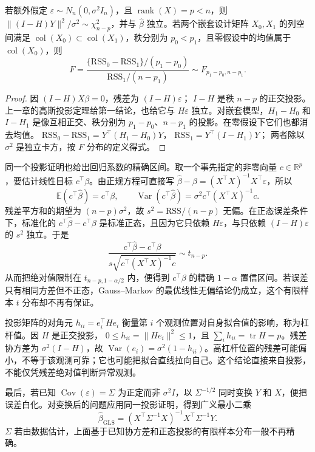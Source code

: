 \begin{theorem}[正态误差下的精确平方和分布]
若额外假定 \(\varepsilon\sim N_n(0,\sigma^2I_n)\)，且
\(\operatorname{rank}(X)=p<n\)，则
\(\|(I-H)Y\|^2/\sigma^2\sim\chi^2_{n-p}\)，并与 \(\widehat\beta\) 独立。若两个嵌套设计矩阵 \(X_0,X_1\) 的列空间满足
\(\operatorname{col}(X_0)\subset\operatorname{col}(X_1)\)，秩分别为
\(p_0<p_1\)，且零假设中的均值属于 \(\operatorname{col}(X_0)\)，则
\[
F=\frac{\{\mathrm{RSS}_0-\mathrm{RSS}_1\}/(p_1-p_0)}
{\mathrm{RSS}_1/(n-p_1)}
\sim F_{p_1-p_0,n-p_1}.
\]
\end{theorem}
\begin{proof}
因 \((I-H)X\beta=0\)，残差为 \((I-H)\varepsilon\)；
\(I-H\) 是秩 \(n-p\) 的正交投影。上一章的高斯投影定理给第一结论，也给它与 \(H\varepsilon\) 独立。对嵌套模型，\(H_1-H_0\) 和 \(I-H_1\) 是像互相正交、秩分别为 \(p_1-p_0\)、\(n-p_1\) 的投影。在零假设下它们也都消去均值。
\(\mathrm{RSS}_0-\mathrm{RSS}_1=Y^\top(H_1-H_0)Y\)，
\(\mathrm{RSS}_1=Y^\top(I-H_1)Y\)；
两者除以 \(\sigma^2\) 是独立卡方，按 \(F\) 分布的定义得式。
\end{proof}

同一个投影证明也给出回归系数的精确区间。取一个事先指定的非零向量 \(c\in\mathbb R^p\)，要估计线性目标 \(c^\top\beta\)。由正规方程可直接写
\(\widehat\beta-\beta=(X^\top X)^{-1}X^\top\varepsilon\)，所以
\[
\mathbb E(c^\top\widehat\beta)=c^\top\beta,
\qquad
\operatorname{Var}(c^\top\widehat\beta)
=\sigma^2c^\top(X^\top X)^{-1}c.
\]
残差平方和的期望为 \((n-p)\sigma^2\)，故
\(s^2=\mathrm{RSS}/(n-p)\) 无偏。在正态误差条件下，标准化的
\(c^\top\widehat\beta-c^\top\beta\) 是标准正态，且因为它只依赖
\(H\varepsilon\)，与只依赖 \((I-H)\varepsilon\) 的 \(s^2\) 独立。于是
\[
\frac{c^\top\widehat\beta-c^\top\beta}
{s\sqrt{c^\top(X^\top X)^{-1}c}}
\sim t_{n-p}.
\]
从而把绝对值限制在 \(t_{n-p,1-\alpha/2}\) 内，便得到 \(c^\top\beta\) 的精确 \(1-\alpha\) 置信区间。若误差只有相同方差但不正态，Gauss--Markov 的最优线性无偏结论仍成立，这个有限样本 \(t\) 分布却不再有保证。

投影矩阵的对角元 \(h_{ii}=e_i^\top He_i\) 衡量第 \(i\) 个观测位置对自身拟合值的影响，称为杠杆值。因 \(H\) 是正交投影，
\(0\le h_{ii}=\|He_i\|^2\le1\)，且
\(\sum_i h_{ii}=\operatorname{tr}H=p\)。残差协方差为
\(\sigma^2(I-H)\)，故
\(\operatorname{Var}(e_i)=\sigma^2(1-h_{ii})\)。高杠杆位置的残差可能偏小，不等于该观测可靠；它也可能把拟合直线拉向自己。这个结论直接来自投影，不能仅凭残差绝对值判断异常观测。

最后，若已知 \(\operatorname{Cov}(\varepsilon)=\Sigma\) 为正定而非
\(\sigma^2I\)，以 \(\Sigma^{-1/2}\) 同时变换 \(Y\) 和 \(X\)，便把误差白化。对变换后的问题应用同一投影证明，得到广义最小二乘
\[
\widehat\beta_{\mathrm{GLS}}
=(X^\top\Sigma^{-1}X)^{-1}X^\top\Sigma^{-1}Y.
\]
\(\Sigma\) 若由数据估计，上面基于已知协方差和正态投影的有限样本分布一般不再精确。

